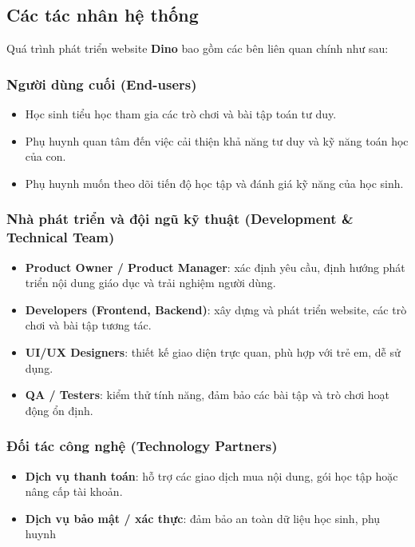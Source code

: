 \subsection{Các tác nhân hệ thống}

Quá trình phát triển website \textbf{Dino} bao gồm các bên liên quan chính như sau:

\subsubsection{Người dùng cuối (End-users)}
\begin{itemize}
\item Học sinh tiểu học tham gia các trò chơi và bài tập toán tư duy.
\item Phụ huynh quan tâm đến việc cải thiện khả năng tư duy và kỹ năng toán học của con.
\item Phụ huynh muốn theo dõi tiến độ học tập và đánh giá kỹ năng của học sinh.
\end{itemize}

\subsubsection{Nhà phát triển và đội ngũ kỹ thuật (Development \& Technical Team)}
\begin{itemize}
\item \textbf{Product Owner / Product Manager}: xác định yêu cầu, định hướng phát triển nội dung giáo dục và trải nghiệm người dùng.
\item \textbf{Developers (Frontend, Backend)}: xây dựng và phát triển website, các trò chơi và bài tập tương tác.
\item \textbf{UI/UX Designers}: thiết kế giao diện trực quan, phù hợp với trẻ em, dễ sử dụng.
\item \textbf{QA / Testers}: kiểm thử tính năng, đảm bảo các bài tập và trò chơi hoạt động ổn định.
\end{itemize}

\subsubsection{Đối tác công nghệ (Technology Partners)}
\begin{itemize}
\item \textbf{Dịch vụ thanh toán}: hỗ trợ các giao dịch mua nội dung, gói học tập hoặc nâng cấp tài khoản.
\item \textbf{Dịch vụ bảo mật / xác thực}: đảm bảo an toàn dữ liệu học sinh, phụ huynh
\end{itemize}